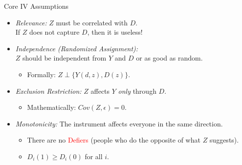 \documentclass[11pt, handout]{beamer}
\begin{document}
\begin{frame}{Core IV Assumptions}
    \begin{itemize}[<+->]
        \item \textit{Relevance:} $Z$ must be correlated with $D$. \\ If $Z$ does not capture $D$, then it is useless!
        \vspace{0.8em}
        \item \textit{Independence (Randomized Assignment):} \\ $Z$ should be independent from $Y$ and $D$ or as good as random.
        \begin{itemize}
            \item Formally: $Z \perp \{Y(d, z), D(z)\}$.
        \end{itemize}
        \vspace{0.8em}
        \item \textit{Exclusion Restriction:} $Z$ affects $Y$ \textit{only} through $D$.
        \begin{itemize}
            \item Mathematically: $Cov(Z, \epsilon) = 0$.
        \end{itemize}
        \vspace{0.8em}
        \item \textit{Monotonicity:} The instrument affects everyone in the same direction. 
        \begin{itemize}
            \item There are no \textcolor{red}{Defiers} (people who do the opposite of what $Z$ suggests).
            \item $D_i(1) \geq D_i(0)$ for all $i$.
        \end{itemize}
    \end{itemize}
\end{frame}
\end{document}
